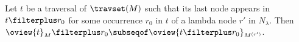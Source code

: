 \begin{proposition}
\label{prop:oview_trav_filtering}
   Let $t$ be a traversal of $\travset(M)$ such that its last node 
   appears in $t \filterplus r_0$ for some occurrence $r_0$ in $t$ of a lambda node $r'$ in $N_\lambda$.
   Then $ \oview{t}_M\filterplus r_0 \subseqof \oview{t\filterplus r_0}_{M^{(r')}}$.
\end{proposition}
%
%
%
%
%
